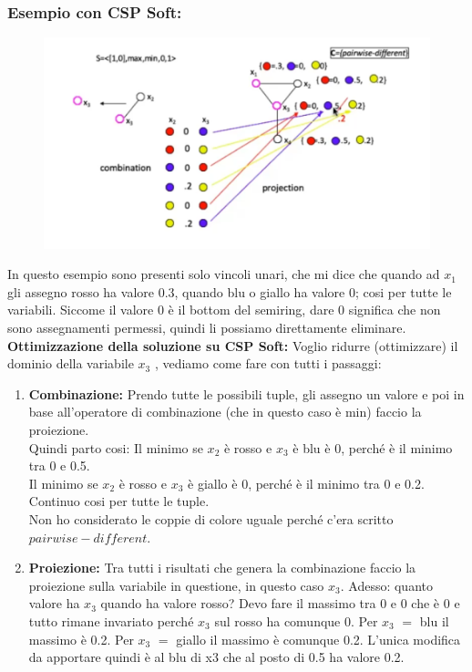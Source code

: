 \subsubsection{Esempio con CSP Soft:}
\begin{figure}[htp]
    \centering
    \includegraphics[width=14cm, keepaspectratio]{img/Cap5/Local.png}
\end{figure}
\noindent In questo esempio sono presenti solo vincoli unari, che mi dice che
quando ad $x_1$ gli assegno rosso ha valore 0.3, quando blu o giallo ha valore
0; cosi per tutte le variabili. Siccome il valore 0 è il bottom del semiring,
dare 0 significa che non sono assegnamenti permessi, quindi li possiamo
direttamente eliminare.\\
\textbf{Ottimizzazione della soluzione su CSP Soft: } Voglio ridurre
(ottimizzare) il dominio della variabile $x_3$ , vediamo come fare con tutti i
passaggi:
\begin{enumerate}
    \item \textbf{Combinazione:} Prendo tutte le possibili tuple, gli assegno un
          valore e poi in base all'operatore di combinazione (che in questo caso
          è min) faccio la proiezione. \\Quindi parto cosi: Il minimo se $x_2$ è
          rosso e $x_3$ è blu è 0, perché è il minimo tra 0 e 0.5. \\Il minimo
          se $x_2$ è rosso e $x_3$ è giallo è 0, perché è il minimo tra 0 e 0.2.
          \\Continuo cosi per tutte le tuple. \\Non ho considerato le coppie di
          colore uguale perché c'era scritto $pairwise-different$.
    \item \textbf{Proiezione:} Tra tutti i risultati che genera la combinazione
          faccio la proiezione sulla variabile in questione, in questo caso $x_3$.
          Adesso: quanto valore ha $x_3$ quando ha valore rosso? Devo fare il massimo
          tra 0 e 0 che è 0 e tutto rimane invariato perché $x_3$ sul rosso ha
          comunque 0. Per $x_3$ $=$ blu il massimo è 0.2. Per $x_3$ $=$ giallo il
          massimo è comunque 0.2. L'unica modifica da apportare quindi è al blu di x3
          che al posto di 0.5 ha valore 0.2.
\end{enumerate}
